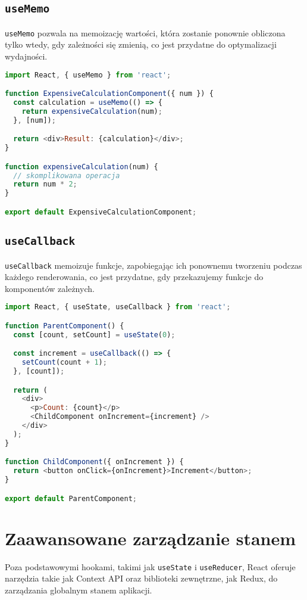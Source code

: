 \documentclass[a4paper,12pt]{article}
\begin{document}
\subsection{\texttt{useMemo}}
\texttt{useMemo} pozwala na memoizację wartości, która zostanie ponownie obliczona tylko wtedy, gdy zależności się zmienią, co jest przydatne do optymalizacji wydajności.

\begin{lstlisting}[language=JavaScript, caption=Przykład użycia \texttt{useMemo}]
import React, { useMemo } from 'react';

function ExpensiveCalculationComponent({ num }) {
  const calculation = useMemo(() => {
    return expensiveCalculation(num);
  }, [num]);

  return <div>Result: {calculation}</div>;
}

function expensiveCalculation(num) {
  // skomplikowana operacja
  return num * 2;
}

export default ExpensiveCalculationComponent;
\end{lstlisting}

\subsection{\texttt{useCallback}}
\texttt{useCallback} memoizuje funkcje, zapobiegając ich ponownemu tworzeniu podczas każdego renderowania, co jest przydatne, gdy przekazujemy funkcje do komponentów zależnych.

\begin{lstlisting}[language=JavaScript, caption=Przykład użycia \texttt{useCallback}]
import React, { useState, useCallback } from 'react';

function ParentComponent() {
  const [count, setCount] = useState(0);

  const increment = useCallback(() => {
    setCount(count + 1);
  }, [count]);

  return (
    <div>
      <p>Count: {count}</p>
      <ChildComponent onIncrement={increment} />
    </div>
  );
}

function ChildComponent({ onIncrement }) {
  return <button onClick={onIncrement}>Increment</button>;
}

export default ParentComponent;
\end{lstlisting}

\section{Zaawansowane zarządzanie stanem}
Poza podstawowymi hookami, takimi jak \texttt{useState} i \texttt{useReducer}, React oferuje narzędzia takie jak Context API oraz biblioteki zewnętrzne, jak Redux, do zarządzania globalnym stanem aplikacji.
\end{document}
